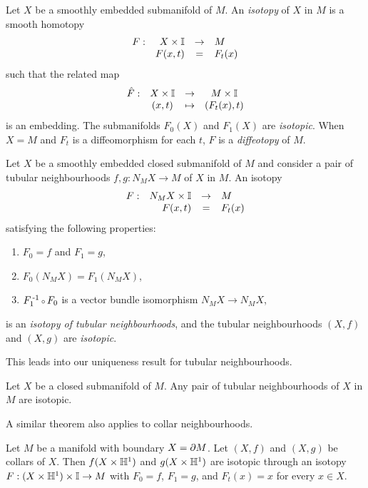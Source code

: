 \begin{defn}[Isotopy]
	\label{def:isotopy}
	Let $X$ be a smoothly embedded submanifold of $M$.
	An \emph{isotopy} of $X$ in $M$ is a smooth homotopy
	\[
		\begin{array}{crcl}
			F: & X\times \mathbb{I} & \to & M \\
			   & F(x,t) & = & F_t(x)
		\end{array}
	\]
	such that the related map
	\[
		\begin{array}{cccc}
			\hat{F}: & X\times\mathbb{I} & \to & M\times\mathbb{I} \\
					 & (x,t) & \mapsto & (F_t(x),t)
		\end{array}
	\]
	is an embedding.
	The submanifolds $F_0(X)$ and $F_1(X)$ are \emph{isotopic}.
	When $X=M$ and $F_t$ is a diffeomorphism for each $t$, $F$ is a \emph{diffeotopy} of $M$.
	
	Let $X$ be a smoothly embedded closed submanifold of $M$ and consider a pair of tubular neighbourhoods $f,g:N_M X\to M$ of $X$ in $M$.
	An isotopy
	\[
		\begin{array}{crcl}
			F: & N_M X\times\mathbb{I} & \to & M \\
			   & F(x,t) & = & F_t(x)
		\end{array}
	\]
	satisfying the following properties:
	\begin{enumerate}
		\item $F_0=f$ and $F_1=g$,
		\item $F_0(N_M X)=F_1(N_M X)$,
		\item $F_1\inv\comp F_0$ is a vector bundle isomorphism $N_M X\to N_M X$,
	\end{enumerate}
	 is an \emph{isotopy of tubular neighbourhoods}, and the tubular neighbourhoods $(X,f)$ and $(X,g)$ are \emph{isotopic}.
\end{defn}

This leads into our uniqueness result for tubular neighbourhoods.

\begin{theorem}
	\label{prop:uniquenesstubularneighbourhood}
	Let $X$ be a closed submanifold of $M$.
	Any pair of tubular neighbourhoods of $X$ in $M$ are isotopic.
\end{theorem}

A similar theorem also applies to collar neighbourhoods.

\begin{theorem}
	Let $M$ be a manifold with boundary $X = \partial M$.
	Let $(X,f)$ and $(X,g)$ be collars of $X$.
	Then $f(X\times\mathbb{H}^1)$ and $g(X\times\mathbb{H}^1)$ are isotopic through an isotopy $F:(X\times\mathbb{H}^1)\times\mathbb{I}\to M$ with $F_0=f$, $F_1=g$, and $F_t(x)=x$ for every $x\in X$.	
\end{theorem}

